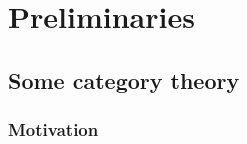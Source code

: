 \documentclass[11pt]{book} %
\begin{document}


\pagestyle{empty} %

\tableofcontents %

\cleardoublepage %

\pagestyle{fancy} %


\part{Preliminaries}


%
\chapter{Some category theory}

\section{Motivation}
\end{document}
